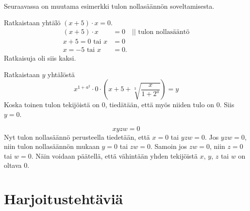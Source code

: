 
Seuraavassa on muutama esimerkki tulon nollasäännön soveltamisesta.

\begin{esimerkki} Ratkaistaan yhtälö $(x+5) \cdot x =0 $.
	\begin{align*}
	(x+5)\cdot x &=0 \quad || \text{ tulon nollasääntö} \\
	x +5= 0 \text{ tai } x &=0 \\
	x= -5 \text{ tai } x &=0.
	\end{align*}
	Ratkaisuja oli siis kaksi.
\end{esimerkki}


\begin{esimerkki} Ratkaistaan $y$ yhtälöstä
	\[x^{1+a^2}\cdot 0\cdot\left(x+5+\sqrt[3]{\frac{x}{1+2^a}}\right)=y\]
	Koska toinen tulon tekijöistä on $0$, tiedätään, että myös niiden tulo on $0$.
	Siis $y=0$.
\end{esimerkki}

\begin{esimerkki}
	\[xyzw=0\]
	Nyt tulon nollasäännö perusteella tiedetään, että $x=0$ tai $yzw=0$. Jos $yzw=0$, niin tulon nollasäännön mukaan $y=0$ tai $zw=0$. Samoin jos $zw=0$, niin $z=0$ tai $w=0$. Näin voidaan päätellä, että vähintään yhden tekijöistä $x$, $y$, $z$ tai $w$ on oltava $0$.
\end{esimerkki}

\section{Harjoitustehtäviä}

